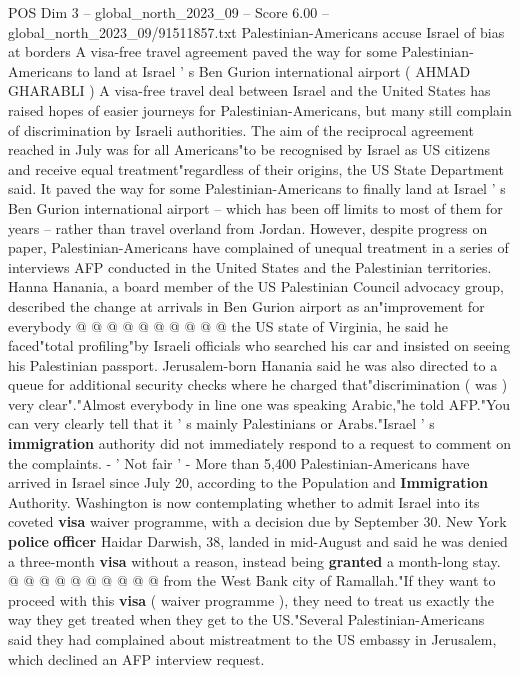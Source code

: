 \begin{textsample}{POS Dim 3 – global\_north\_2023\_09 – Score 6.00 – global\_north\_2023\_09/91511857.txt}  \label{ex:f3_pos_065}
Palestinian-Americans accuse Israel of bias at borders A visa-free travel agreement paved the way for some Palestinian-Americans to land at Israel ' s Ben Gurion international airport ( AHMAD GHARABLI ) A visa-free travel deal between Israel and the United States has raised hopes of easier journeys for Palestinian-Americans, but many still complain of discrimination by Israeli authorities.
The aim of the reciprocal agreement reached in July was for all Americans"to be recognised by Israel as US citizens and receive equal treatment"regardless of their origins, the US State Department said.
It paved the way for some Palestinian-Americans to finally land at Israel ' s Ben Gurion international airport -- which has been off limits to most of them for years -- rather than travel overland from Jordan.
However, despite progress on paper, Palestinian-Americans have complained of unequal treatment in a series of interviews AFP conducted in the United States and the Palestinian territories.
Hanna Hanania, a board member of the US Palestinian Council advocacy group, described the change at arrivals in Ben Gurion airport as an"improvement for everybody @ @ @ @ @ @ @ @ @ @ the US state of Virginia, he said he faced"total profiling"by Israeli officials who searched his car and insisted on seeing his Palestinian passport.
Jerusalem-born Hanania said he was also directed to a queue for additional security checks where he charged that"discrimination ( was ) very clear"."Almost everybody in line one was speaking Arabic,"he told AFP."You can very clearly tell that it ' s mainly Palestinians or Arabs."Israel ' s \textbf{immigration} authority did not immediately respond to a request to comment on the complaints. - ' Not fair ' - More than 5,400 Palestinian-Americans have arrived in Israel since July 20, according to the Population and \textbf{Immigration} Authority.
Washington is now contemplating whether to admit Israel into its coveted \textbf{visa} waiver programme, with a decision due by September 30.
New York \textbf{police} \textbf{officer} Haidar Darwish, 38, landed in mid-August and said he was denied a three-month \textbf{visa} without a reason, instead being \textbf{granted} a month-long stay. @ @ @ @ @ @ @ @ @ @ from the West Bank city of Ramallah."If they want to proceed with this \textbf{visa} ( waiver programme ), they need to treat us exactly the way they get treated when they get to the US."Several Palestinian-Americans said they had complained about mistreatment to the US embassy in Jerusalem, which declined an AFP interview request.

\end{textsample}
